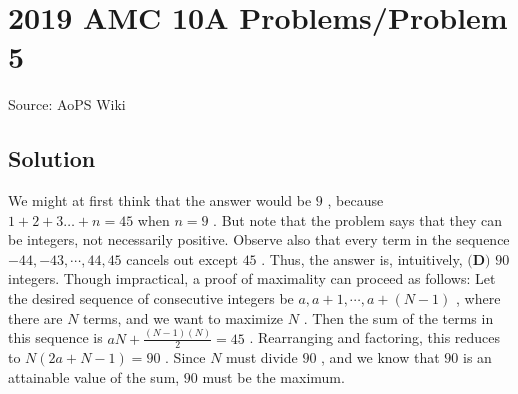 \documentclass[12pt]{article}
\begin{document}
\section*{{2019 AMC 10A Problems/Problem 5}}
Source: AoPS Wiki

\subsection*{Solution}
We might at first think that the answer would be $9$ , because $1+2+3 \dots +n = 45$ when $n = 9$ . But note that the problem says that they can be integers, not necessarily positive. Observe also that every term in the sequence $-44, -43, \cdots, 44, 45$ cancels out except $45$ . Thus, the answer is, intuitively, $\boxed{\textbf{(D) } 90 }$ integers. Though impractical, a proof of maximality can proceed as follows: Let the desired sequence of consecutive integers be $a, a+1, \cdots, a+(N-1)$ , where there are $N$ terms, and we want to maximize $N$ . Then the sum of the terms in this sequence is $aN + \frac{(N-1)(N)}{2}=45$ . Rearranging and factoring, this reduces to $N(2a+N-1) = 90$ . Since $N$ must divide $90$ , and we know that $90$ is an attainable value of the sum, $90$ must be the maximum.
\end{document}
